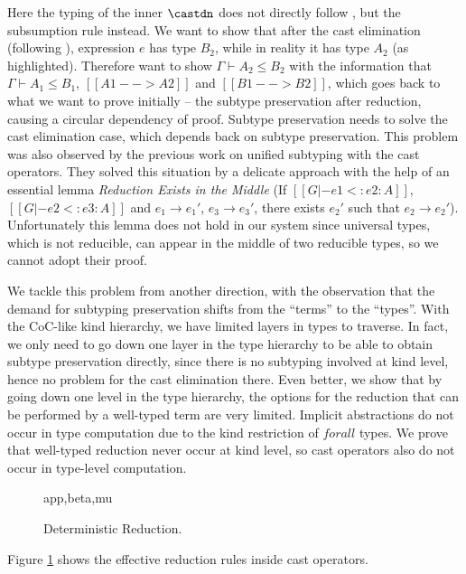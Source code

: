 Here the typing of the inner $\castdn$ does not directly follow
, but the subsumption rule instead. We want to show that after
the cast elimination (following ), expression $e$ has type $B_2$,
while in reality it has type $A_2$ (as highlighted).
Therefore want to show $\Gamma \vdash A_2 \le B_2$ with the information that
$\Gamma \vdash A_1 \le B_1$, $[[A1 --> A2]]$
and $[[B1 --> B2]]$, which goes back to what we want to prove initially --
the subtype preservation after reduction, causing a circular dependency of proof.
Subtype preservation needs to solve the cast elimination case, which depends back
on subtype preservation.
This problem was also observed by the previous work on unified subtyping
with the cast operators\cite{yang2017unifying}. They solved this situation
by a delicate approach with the help of an essential lemma
\emph{Reduction Exists in the Middle} (If $[[G |- e1 <: e2 : A]]$, $[[G |- e2 <: e3 : A]]$
and $e_1 \longrightarrow e_1'$, $e_3 \longrightarrow e_3'$, there exists $e_2'$
such that $e_2 \longrightarrow e_2'$). Unfortunately this lemma does not hold
in our system since universal types, which is not reducible, can appear in the
middle of two reducible types, so we cannot adopt their proof.

We tackle this problem from another direction, with the observation that the
demand for subtyping preservation shifts from the ``terms'' to the ``types''.
With the CoC-like kind hierarchy, we have limited layers in types to traverse.
In fact, we only need to go down one layer in the type hierarchy to be able to
obtain subtype preservation directly,
since there is no subtyping involved at kind level,
hence no problem for the cast elimination there.
Even better, we show that by going down one level in the type hierarchy, the options
for the reduction that can be performed by a well-typed term are very limited.
Implicit abstractions do not occur in type computation due to the kind
restriction of $forall$ types. We prove that well-typed reduction never occur
at kind level, so cast operators also do not occur in type-level computation.

\begin{figure}
      {app,beta,mu}
    \caption{Deterministic Reduction.}
    \label{fig:deterministic-reduction}
\end{figure}

Figure \ref{fig:deterministic-reduction} shows the effective reduction rules
inside cast operators.

